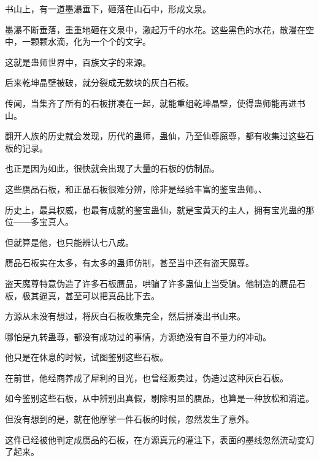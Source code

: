\begin{this_body}
书山上，有一道墨瀑垂下，砸落在山石中，形成文泉。

墨瀑不断垂落，重重地砸在文泉中，激起万千的水花。这些黑色的水花，散漫在空中，一颗颗水滴，化为一个个的文字。

这就是蛊师世界中，百族文字的来源。

后来乾坤晶壁被破，就分裂成无数块的灰白石板。

传闻，当集齐了所有的石板拼凑在一起，就能重组乾坤晶壁，使得蛊师能再进书山。

翻开人族的历史就会发现，历代的蛊师，蛊仙，乃至仙尊魔尊，都有收集过这些石板的记录。

也正是因为如此，很快就会出现了大量的石板的仿制品。

这些赝品石板，和正品石板很难分辨，除非是经验丰富的鉴宝蛊师。、

历史上，最具权威，也最有成就的鉴宝蛊仙，就是宝黄天的主人，拥有宝光蛊的那位――多宝真人。

但就算是他，也只能辨认七八成。

赝品石板实在太多，有太多的蛊师仿制，甚至当中还有盗天魔尊。

盗天魔尊特意伪造了许多石板赝品，哄骗了许多蛊仙上当受骗。他制造的赝品石板，极其逼真，甚至可以把真品比下去。

方源从未没有想过，将灰白石板收集完全，然后拼凑出书山来。

哪怕是九转蛊尊，都没有成功过的事情，方源绝没有自不量力的冲动。

他只是在休息的时候，试图鉴别这些石板。

在前世，他经商养成了犀利的目光，也曾经贩卖过，伪造过这种灰白石板。

如今鉴别这些石板，从中辨别出真假，剔除明显的赝品，也算是一种放松和消遣。

但没有想到的是，就在他摩挲一件石板的时候，忽然发生了意外。

这件已经被他判定成赝品的石板，在方源真元的灌注下，表面的墨线忽然流动变幻了起来。

\end{this_body}

